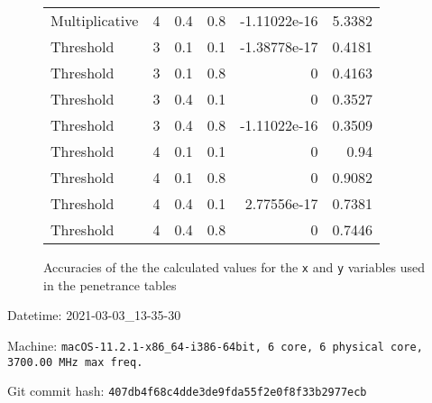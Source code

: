\documentclass{article}
\begin{document}
\begin{figure}[H]
\begin{tabular}{lrrrrr}
 Multiplicative &       4 &   0.4 &            0.8 & -1.11022e-16 &            5.3382 \\
 Threshold      &       3 &   0.1 &            0.1 & -1.38778e-17 &            0.4181 \\
 Threshold      &       3 &   0.1 &            0.8 &  0           &            0.4163 \\
 Threshold      &       3 &   0.4 &            0.1 &  0           &            0.3527 \\
 Threshold      &       3 &   0.4 &            0.8 & -1.11022e-16 &            0.3509 \\
 Threshold      &       4 &   0.1 &            0.1 &  0           &            0.94   \\
 Threshold      &       4 &   0.1 &            0.8 &  0           &            0.9082 \\
 Threshold      &       4 &   0.4 &            0.1 &  2.77556e-17 &            0.7381 \\
 Threshold      &       4 &   0.4 &            0.8 &  0           &            0.7446 \\
\hline
\end{tabular}
\caption{Accuracies of the the calculated values for the \texttt{x} and \texttt{y} variables used in the penetrance tables}
\end{figure}
Datetime: 2021-03-03\_13-35-30

Machine: \texttt{macOS-11.2.1-x86\_64-i386-64bit, 6 core, 6 physical core, 3700.00 MHz max freq.}

Git commit hash: \texttt{407db4f68c4dde3de9fda55f2e0f8f33b2977ecb}
\end{document}

